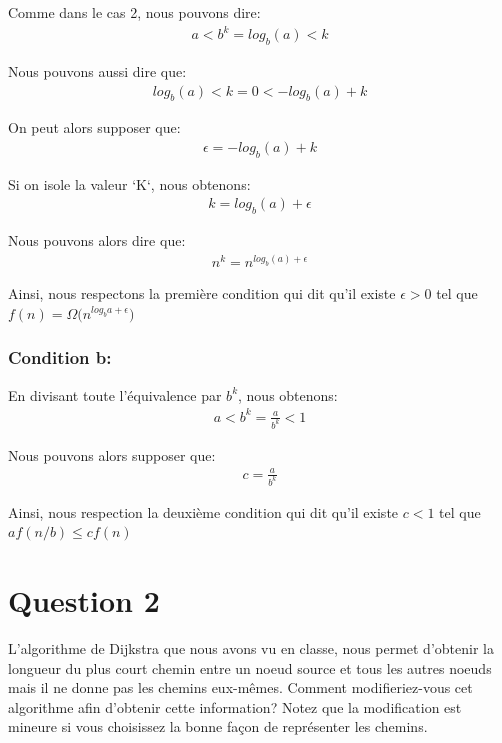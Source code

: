 \documentclass[12pt]{article}
\begin{document}
Comme dans le cas 2, nous pouvons dire:
\begin{align*}
	a < b^k =  log_b(a) <  k
\end{align*}

Nous pouvons aussi dire que:
\begin{align*}
	log_b(a) <  k = 0 < -log_b(a) + k
\end{align*}

On peut alors supposer que:
\begin{align*}
	\epsilon = -log_b(a) + k
\end{align*}

Si on isole la valeur `K`, nous obtenons:
\begin{align*}
	k = log_b(a) + \epsilon
\end{align*}

Nous pouvons alors dire que:
\begin{align*}
	n^k = n ^{log_b(a) + \epsilon}
\end{align*}

Ainsi, nous respectons la première condition qui dit qu'il existe \( \epsilon > 0 \) tel que \( f(n) = \Omega\big(n^{log_ba+\epsilon}  \big) \)


\subsubsection*{Condition b:}
En divisant toute l'équivalence par \(b^k\), nous obtenons:
\begin{align*}
	a < b^k =  \frac{a}{b^k} < 1
\end{align*}

Nous pouvons alors supposer que:
\begin{align*}
	c =  \frac{a}{b^k}
\end{align*}

Ainsi, nous respection  la deuxième condition qui dit qu'il existe  \( c < 1 \) tel que \( af(n/b) \leq cf(n) \)


\newpage

\section*{Question 2}
L’algorithme de Dijkstra que nous avons vu en classe, nous permet
d’obtenir la longueur du plus court chemin entre un noeud source et
tous les autres noeuds mais il ne donne pas les chemins eux-mêmes. Comment modifieriez-vous cet algorithme afin d’obtenir cette information? Notez que la modification est mineure si vous choisissez la bonne façon de représenter les chemins. \newline
\end{document}

